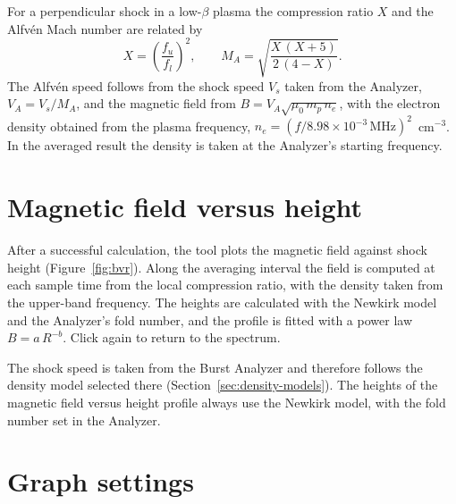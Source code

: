 \begin{background}
  For a perpendicular shock in a low-\(\beta\) plasma the compression ratio \(X\) and the
  Alfvén Mach number are related by \parencite{vrsnak2002}
  \begin{equation*}
    X = \left(\frac{f_u}{f_l}\right)^2, \qquad
    M_A = \sqrt{\frac{X\,(X+5)}{2\,(4-X)}}.
  \end{equation*}
  The Alfvén speed follows from the shock speed \(V_s\) taken from the Analyzer,
  \(V_A = V_s/M_A\), and the magnetic field from
  \(B = V_A\sqrt{\mu_0\,m_p\,n_e}\), with the electron density obtained from the plasma
  frequency, \(n_e = (f/8.98\times10^{-3}\,\mathrm{MHz})^2\)~cm\(^{-3}\). In the averaged
  result the density is taken at the Analyzer's starting frequency.
\end{background}

\section{Magnetic field versus height}
\label{sec:bvr}

After a successful calculation, the  tool  plots the magnetic field
against shock height (Figure~\ref{fig:bvr}). Along the averaging interval the field is
computed at each sample time from the local compression ratio, with the density taken from
the upper-band frequency. The heights are calculated with the Newkirk model and the
Analyzer's fold number, and the profile is fitted with a power law \(B = a\,R^{-b}\). Click
 again to return to the spectrum.


\begin{note}
  The shock speed is taken from the Burst Analyzer and therefore follows the density model
  selected there (Section~\ref{sec:density-models}). The heights of the magnetic field
  versus height profile always use the Newkirk model, with the fold number set in the
  Analyzer.
\end{note}

\section{Graph settings}
\label{sec:bs-graph-settings}


